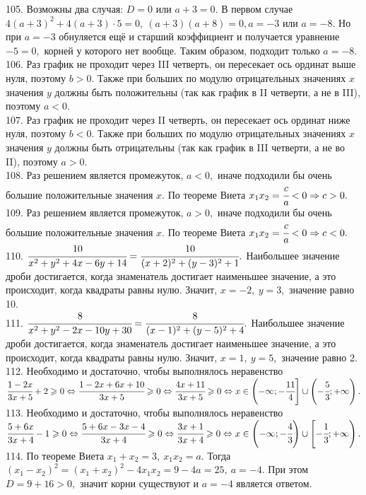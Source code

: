 105. Возможны два случая: $D=0$ или $a+3=0.$ В первом случае $4(a+3)^2+4(a+3)\cdot5=0,\ (a+3)(a+8)=0, a=-3$ или $a=-8.$ Но при $a=-3$ обнуляется ещё и старший коэффициент и получается уравнение $-5=0,$ корней у которого нет вообще. Таким образом, подходит только $a=-8.$\\
106. Раз график не проходит через III четверть, он пересекает ось ординат выше нуля, поэтому $b>0.$ Также при больших по модулю отрицательных значениях $x$ значения $y$ должны быть положительны (так как график в II четверти, а не в III), поэтому $a<0.$\\
107. Раз график не проходит через II четверть, он пересекает ось ординат ниже нуля, поэтому $b<0.$ Также при больших по модулю отрицательных значениях $x$ значения $y$ должны быть отрицательны (так как график в III четверти, а не во II), поэтому $a>0.$\\
108. Раз решением является промежуток, $a<0,$ иначе подходили бы очень большие положительные значения $x.$ По теореме Виета $x_1x_2=\cfrac{c}{a}<0\Rightarrow c>0.$\\
109. Раз решением является промежуток, $a>0,$ иначе подходили бы очень большие положительные значения $x.$ По теореме Виета $x_1x_2=\cfrac{c}{a}<0\Rightarrow c<0.$\\
110. $\cfrac{10}{x^2+y^2+4x-6y+14}=\cfrac{10}{(x+2)^2+(y-3)^2+1}.$ Наибольшее значение дроби достигается, когда знаменатель достигает наименьшее значение, а это происходит, когда квадраты равны нулю. Значит, $x=-2,\ y=3,$ значение равно 10.\\
111. $\cfrac{8}{x^2+y^2-2x-10y+30}=\cfrac{8}{(x-1)^2+(y-5)^2+4}.$ Наибольшее значение дроби достигается, когда знаменатель достигает наименьшее значение, а это происходит, когда квадраты равны нулю. Значит, $x=1,\ y=5,$ значение равно 2.\\
112. Необходимо и достаточно, чтобы выполнялось неравенство $\cfrac{1-2x}{3x+5}+2\geqslant0\Leftrightarrow\cfrac{1-2x+6x+10}{3x+5}\geqslant0\Leftrightarrow
\cfrac{4x+11}{3x+5}\geqslant0\Leftrightarrow x\in\left(-\infty;-\cfrac{11}{4}\right]\cup\left(-\cfrac{5}{3};+\infty\right).$\\
113. Необходимо и достаточно, чтобы выполнялось неравенство $\cfrac{5+6x}{3x+4}-1\geqslant0\Leftrightarrow\cfrac{5+6x-3x-4}{3x+4}\geqslant0\Leftrightarrow
\cfrac{3x+1}{3x+4}\geqslant0\Leftrightarrow x\in\left(-\infty;-\cfrac{4}{3}\right)\cup\left[-\cfrac{1}{3};+\infty\right).$\\
114. По теореме Виета $x_1+x_2=3,\ x_1x_2=a.$ Тогда $(x_1-x_2)^2=(x_1+x_2)^2-4x_1x_2=9-4a=25,\ a=-4.$ При этом $D=9+16>0,$ значит корни существуют и $a=-4$ является ответом.\\
